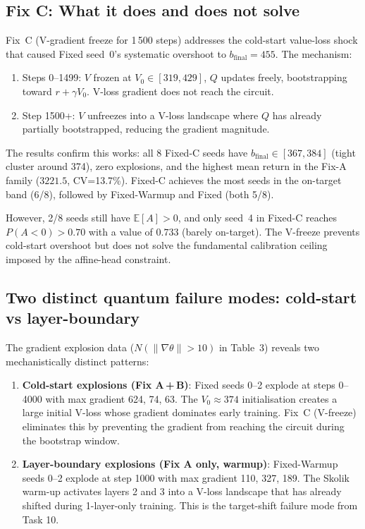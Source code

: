 \documentclass[10pt,a4paper]{article}
\begin{document}
\subsection{Fix C: What it does and does not solve}

Fix~C (V-gradient freeze for 1\,500 steps) addresses the cold-start value-loss
shock that caused Fixed seed~0's systematic overshoot to $b_\text{final}=455$.
The mechanism:
\begin{enumerate}
  \item Steps 0--1499: $V$ frozen at $V_0\in[319,429]$, $Q$ updates freely,
        bootstrapping toward $r+\gamma V_0$. V-loss gradient does not reach the
        circuit.
  \item Step 1500+: $V$ unfreezes into a V-loss landscape where $Q$ has already
        partially bootstrapped, reducing the gradient magnitude.
\end{enumerate}

The results confirm this works: all 8 Fixed-C seeds have $b_\text{final}\in[367,384]$
(tight cluster around 374), zero explosions, and the highest mean return in the
Fix-A family ($3221.5$, CV=13.7\%). Fixed-C achieves the most seeds in the
on-target band (6/8), followed by Fixed-Warmup and Fixed (both 5/8).

However, 2/8 seeds still have $\mathbb{E}[A]>0$, and only seed~4 in Fixed-C
reaches $P(A<0)>0.70$ with a value of $0.733$ (barely on-target). The V-freeze
prevents cold-start overshoot but does not solve the fundamental calibration
ceiling imposed by the affine-head constraint.

\subsection{Two distinct quantum failure modes: cold-start vs layer-boundary}

The gradient explosion data ($N(\|\nabla\theta\|>10)$ in Table~3) reveals two
mechanistically distinct patterns:

\begin{enumerate}
  \item \textbf{Cold-start explosions (Fix A\,+\,B)}: Fixed seeds 0--2 explode
        at steps 0--4000 with max gradient 624, 74, 63. The $V_0\approx374$
        initialisation creates a large initial V-loss whose gradient dominates
        early training. Fix~C (V-freeze) eliminates this by preventing the
        gradient from reaching the circuit during the bootstrap window.
  \item \textbf{Layer-boundary explosions (Fix A only, warmup)}: Fixed-Warmup
        seeds 0--2 explode at step 1000 with max gradient 110, 327, 189. The
        Skolik warm-up activates layers 2 and 3 into a V-loss landscape that
        has already shifted during 1-layer-only training. This is the
        target-shift failure mode from Task 10.
\end{enumerate}
\end{document}
